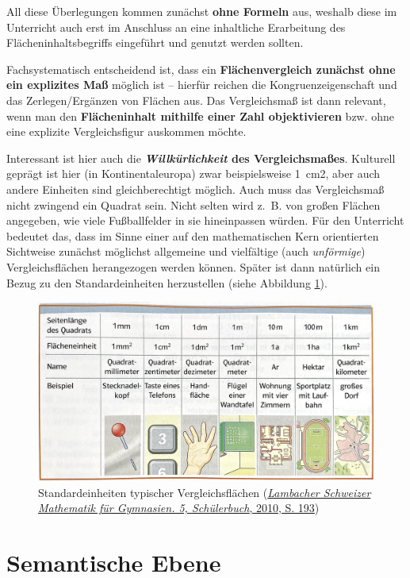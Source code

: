 \documentclass[
]{scrbook}
\theoremstyle{definition}
\theoremstyle{definition}
\theoremstyle{definition}
\theoremstyle{definition}
\theoremstyle{remark}
\begin{document}
All diese Überlegungen kommen zunächst \textbf{ohne Formeln} aus, weshalb diese im Unterricht auch erst im Anschluss an eine inhaltliche Erarbeitung des Flächeninhaltsbegriffs eingeführt und genutzt werden sollten.

Fachsystematisch entscheidend ist, dass ein \textbf{Flächenvergleich zunächst ohne ein explizites Maß} möglich ist -- hierfür reichen die Kongruenzeigenschaft und das Zerlegen/Ergänzen von Flächen aus. Das Vergleichsmaß ist dann relevant, wenn man den \textbf{Flächeninhalt mithilfe einer Zahl objektivieren} bzw. ohne eine explizite Vergleichsfigur auskommen möchte.

Interessant ist hier auch die \textbf{\emph{Willkürlichkeit} des Vergleichsmaßes}. Kulturell geprägt ist hier (in Kontinentaleuropa) zwar beispielsweise 1~cm2, aber auch andere Einheiten sind gleichberechtigt möglich. Auch muss das Vergleichsmaß nicht zwingend ein Quadrat sein. Nicht selten wird z.~B. von großen Flächen angegeben, wie viele Fußballfelder in sie hineinpassen würden. Für den Unterricht bedeutet das, dass im Sinne einer auf den mathematischen Kern orientierten Sichtweise zunächst möglichst allgemeine und vielfältige (auch \emph{unförmige}) Vergleichsflächen herangezogen werden können. Später ist dann natürlich ein Bezug zu den Standardeinheiten herzustellen (siehe Abbildung \ref{fig:FlaecheEinheiten}).



\begin{figure}

{\centering \includegraphics[width=0.75\linewidth]{pictures/5-Einheiten} 

}

\caption{Standardeinheiten typischer Vergleichsflächen (\protect\hyperlink{ref-Lambacher2010}{\emph{Lambacher Schweizer Mathematik für Gymnasien. 5, Schülerbuch}, 2010, S. 193})}\label{fig:FlaecheEinheiten}
\end{figure}

\hypertarget{semantische-ebene-1}{%
\section{Semantische Ebene}\label{semantische-ebene-1}}
\end{document}
